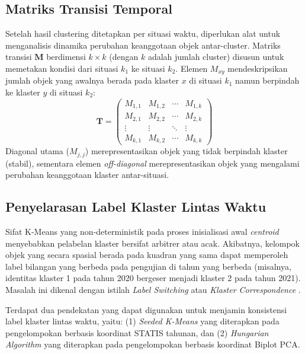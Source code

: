 \subsection{\normalsize Matriks Transisi Temporal}

Setelah hasil clustering ditetapkan per situasi waktu, diperlukan alat untuk menganalisis dinamika perubahan keanggotaan objek antar-cluster. Matriks transisi $\mathbf{M}$ berdimensi $k \times k$ (dengan $k$ adalah jumlah cluster) disusun untuk memetakan kondisi dari situasi $k_1$ ke situasi $k_2$. Elemen $M_{xy}$ mendeskripsikan jumlah objek yang awalnya berada pada klaster $x$ di situasi $k_1$ namun berpindah ke klaster $y$ di situasi $k_2$:
\begin{equation}
    \mathbf{T} = 
    \begin{pmatrix}
    M_{1,1} & M_{1,2} & \cdots & M_{1,k} \\
    M_{2,1} & M_{2,2} & \cdots & M_{2,k} \\
    \vdots & \vdots & \ddots & \vdots \\
    M_{k,1} & M_{k,2} & \cdots & M_{k,k}
    \end{pmatrix}
\end{equation}
Diagonal utama ($M_{j,j}$) merepresentasikan objek yang tidak berpindah klaster (stabil), sementara elemen \textit{off-diagonal} merepresentasikan objek yang mengalami perubahan keanggotaan klaster antar-situasi.

\subsection{\normalsize Penyelarasan Label Klaster Lintas Waktu} \label{subsec:penyelarasan_label}

Sifat K-Means yang non-deterministik pada proses inisialisasi awal \textit{centroid} menyebabkan pelabelan klaster bersifat arbitrer atau acak. Akibatnya, kelompok objek yang secara spasial berada pada kuadran yang sama dapat memperoleh label bilangan yang berbeda pada pengujian di tahun yang berbeda (misalnya, identitas klaster 1 pada tahun 2020 bergeser menjadi klaster 2 pada tahun 2021). Masalah ini dikenal dengan istilah \textit{Label Switching} atau \textit{Klaster Correspondence} \citep{kuhn1955}.

Terdapat dua pendekatan yang dapat digunakan untuk menjamin konsistensi label klaster lintas waktu, yaitu: (1) \textit{Seeded K-Means} yang diterapkan pada pengelompokan berbasis koordinat STATIS tahunan, dan (2) \textit{Hungarian Algorithm} yang diterapkan pada pengelompokan berbasis koordinat Biplot PCA.


